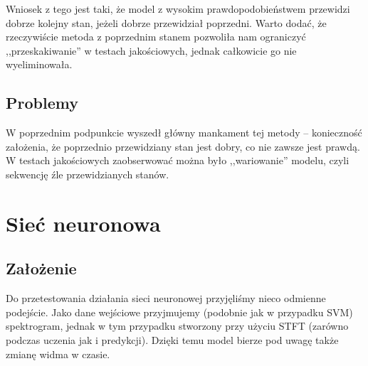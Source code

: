 \documentclass[polish]{article}
\begin{document}
Wniosek z tego jest taki, że model
z wysokim prawdopodobieństwem przewidzi dobrze kolejny stan, jeżeli dobrze przewidział poprzedni. 
Warto dodać, że rzeczywiście metoda z poprzednim stanem pozwoliła nam ograniczyć ,,przeskakiwanie'' 
w testach jakościowych, jednak całkowicie go nie wyeliminowała.
\subsection{Problemy}
W poprzednim podpunkcie wyszedł główny mankament tej metody -- konieczność założenia, że poprzednio
przewidziany stan jest dobry, co nie zawsze jest prawdą. W testach jakościowych zaobserwować można było
,,wariowanie'' modelu, czyli sekwencję źle przewidzianych stanów.

\section{Sieć neuronowa}
\subsection{Założenie}
Do przetestowania działania sieci neuronowej przyjęliśmy nieco odmienne podejście. Jako dane wejściowe przyjmujemy (podobnie jak w przypadku SVM) spektrogram, jednak w tym przypadku stworzony przy użyciu STFT (zarówno podczas uczenia jak i predykcji). Dzięki temu model bierze pod uwagę także zmianę widma w czasie.
\end{document}
